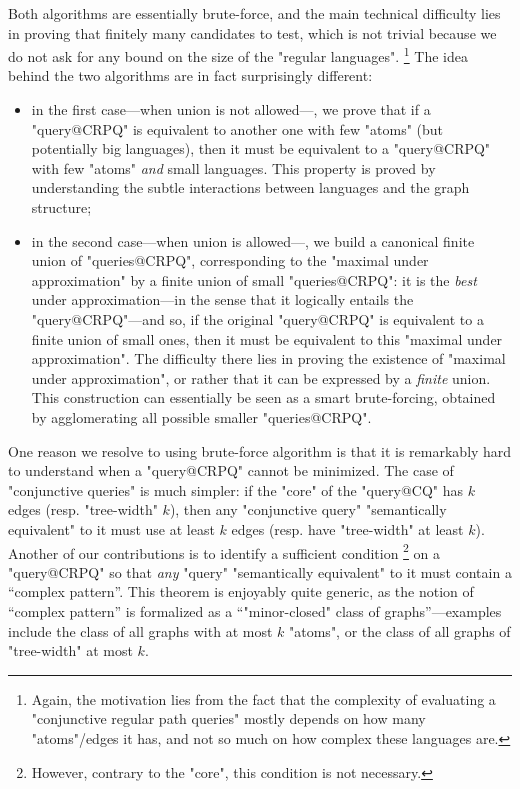 Both algorithms are essentially brute-force, and the main technical difficulty
lies in proving that finitely many candidates to test, which is not
trivial because we do not ask for any bound on the size of the "regular languages".%
\footnote{Again, the motivation lies from the fact that the complexity of evaluating
a "conjunctive regular path queries" mostly depends on how many "atoms"/edges it has,
and not so much on how complex these languages are.}
The idea behind the two algorithms are in fact surprisingly different:
\begin{itemize}
	\item in the first case---when union is not allowed---, we prove that
		if a "query@CRPQ" is equivalent to another one with few
		"atoms" (but potentially big languages), then it must be
		equivalent to a "query@CRPQ" with few "atoms" \emph{and} small languages.
		This property is proved by understanding the subtle interactions between
		languages and the graph structure;
	\item in the second case---when union is allowed---, we build a canonical
		finite union of "queries@CRPQ", corresponding to the
		"maximal under approximation" by a finite union of small "queries@CRPQ": 
		it is the \emph{best} under approximation---in the sense that
		it logically entails the "query@CRPQ"---and so, if the original
		"query@CRPQ" is equivalent to a finite union of small ones, then
		it must be equivalent to this "maximal under approximation".
		The difficulty there lies in proving the existence of "maximal under approximation",
		or rather that it can be expressed by a \emph{finite} union.
		This construction can essentially be seen as a
		smart brute-forcing, obtained by agglomerating all possible smaller "queries@CRPQ".
\end{itemize}

One reason we resolve to using brute-force algorithm is that it is
remarkably hard to understand when a "query@CRPQ" cannot be minimized.
The case of "conjunctive queries" is much simpler: if the "core" 
of the "query@CQ" has $k$ edges (resp. "tree-width" $k$),
then any "conjunctive query" "semantically equivalent" to it must use at least $k$ edges
(resp. have "tree-width" at least $k$).
Another of our contributions is to identify a sufficient condition%
\footnote{However, contrary to the "core", this condition is not necessary.}
on a "query@CRPQ" so that \emph{any} "query" "semantically equivalent" to it
must contain a ``complex pattern''. This theorem is enjoyably quite generic,
as the notion of ``complex pattern'' is formalized as a ``"minor-closed" class
of graphs''---examples include the class of all graphs with at most $k$ "atoms",
or the class of all graphs of "tree-width" at most $k$.

